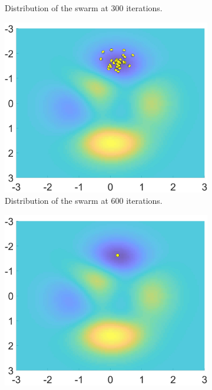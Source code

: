 \begin{figure}[hbp]
\begin{subfigure}[b]{0.5\textwidth}
    \caption{Distribution of the swarm at 300 iterations.}
    \label{fig:f4}
  \end{subfigure}
  \begin{subfigure}[b]{0.5\textwidth}
    \includegraphics[width=\textwidth, height=\textwidth]{Part 2 - Search-Based Optimization/Particle Swarm Optimization/Images/FIG5.1.jpg}
    \caption{Distribution of the swarm at 600 iterations.}
    \label{fig:f5}
  \end{subfigure}
   \begin{subfigure}[b]{0.5\textwidth}
    \includegraphics[width=\textwidth, height=\textwidth]{Part 2 - Search-Based Optimization/Particle Swarm Optimization/Images/FIG8.1.jpg}

\end{subfigure}
\end{figure}
